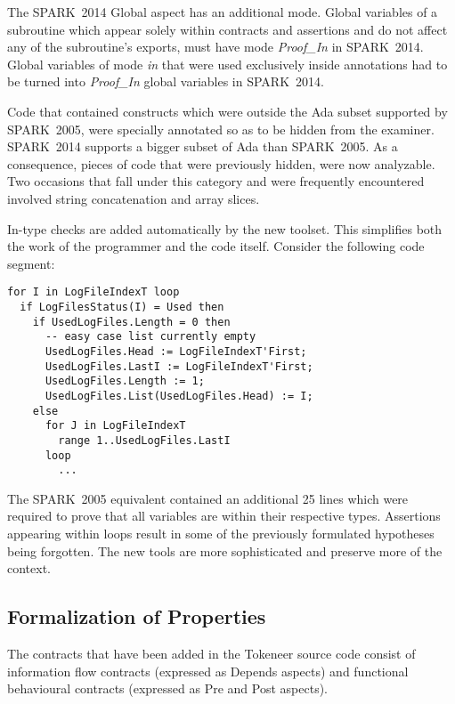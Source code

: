 \documentclass[10pt,a4paper,twocolumn]{article}
\newcommand{\oldspark}{SPARK~2005\xspace}
\newcommand{\newspark}{SPARK~2014\xspace}
\begin{document}
The \newspark Global aspect has an additional mode. Global variables
of a subroutine which appear solely within contracts and assertions
and do not affect any of the subroutine's exports, must have mode
\emph{Proof\_In} in \newspark. Global variables of mode \emph{in} that
were used exclusively inside annotations had to be turned into
\emph{Proof\_In} global variables in \newspark.

Code that contained constructs which were outside the Ada subset
supported by \oldspark, were specially annotated so as to be hidden
from the examiner. \newspark supports a bigger subset of Ada than
\oldspark. As a consequence, pieces of code that were previously
hidden, were now analyzable. Two occasions that fall under this
category and were frequently encountered involved string concatenation
and array slices.

In-type checks are added automatically by the new toolset. This
simplifies both the work of the programmer and the code
itself. Consider the following code segment:
\begin{lstlisting}
for I in LogFileIndexT loop
  if LogFilesStatus(I) = Used then
    if UsedLogFiles.Length = 0 then
      -- easy case list currently empty
      UsedLogFiles.Head := LogFileIndexT'First;
      UsedLogFiles.LastI := LogFileIndexT'First;
      UsedLogFiles.Length := 1;
      UsedLogFiles.List(UsedLogFiles.Head) := I;
    else
      for J in LogFileIndexT
        range 1..UsedLogFiles.LastI
      loop
        ...
\end{lstlisting}
The \oldspark equivalent contained an additional 25 lines which were
required to prove that all variables are within their respective
types. Assertions appearing within loops result in some of the
previously formulated hypotheses being forgotten. The new tools are
more sophisticated and preserve more of the context.


\subsection{Formalization of Properties}

The contracts that have been added in the Tokeneer source code consist
of information flow contracts (expressed as Depends aspects) and
functional behavioural contracts (expressed as Pre and Post aspects).
\end{document}
